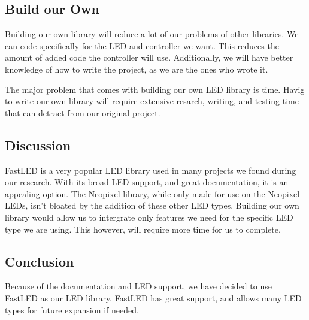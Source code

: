 \documentclass[onecolumn, draftclsnofoot,10pt, compsoc]{IEEEtran}
\begin{document}
		\subsection{Build our Own}
		\noindent Building our own library will reduce a lot of our problems of other
		libraries. We can code specifically for the LED and controller we want.
		This reduces the amount of added code the controller will use. Additionally,
		we will have better knowledge of how to write the project, as we are the
		ones who wrote it.

		\vspace{5mm}
		\noindent The major problem that comes with building our own LED library is time.
		Havig to write our own library will require extensive resarch, writing, and
		testing time that can detract from our original project.
		\subsection{Discussion}
		\noindent FastLED is a very popular LED library used in many projects we found
		during our research. With its broad LED support, and great documentation,
		it is an appealing option. The Neopixel library, while only made for use on
		the Neopixel LEDs, isn't bloated by the addition of these other LED types.
		Building our own library would allow us to intergrate only features we need
		for the specific LED type we are using. This however, will require more
		time for us to complete.
		\subsection{Conclusion}
		\noindent Because of the documentation and LED support, we have decided to use
		FastLED as our LED library. FastLED has great support, and allows many LED
		types for future expansion if needed.


	
\end{document}
